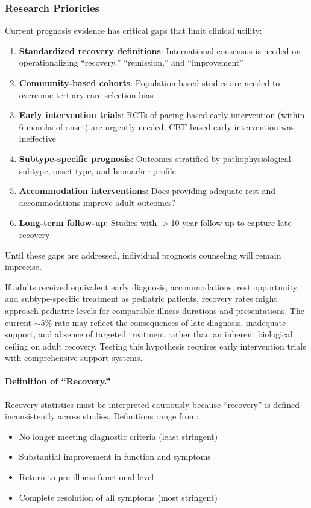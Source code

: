 \subsubsection{Research Priorities}

\begin{open_question}
Current prognosis evidence has critical gaps that limit clinical utility:
\begin{enumerate}
    \item \textbf{Standardized recovery definitions}: International consensus is needed on operationalizing ``recovery,'' ``remission,'' and ``improvement''
    \item \textbf{Community-based cohorts}: Population-based studies are needed to overcome tertiary care selection bias
    \item \textbf{Early intervention trials}: RCTs of pacing-based early intervention (within 6 months of onset) are urgently needed; CBT-based early intervention was ineffective
    \item \textbf{Subtype-specific prognosis}: Outcomes stratified by pathophysiological subtype, onset type, and biomarker profile
    \item \textbf{Accommodation interventions}: Does providing adequate rest and accommodations improve adult outcomes?
    \item \textbf{Long-term follow-up}: Studies with $>$10 year follow-up to capture late recovery
\end{enumerate}
Until these gaps are addressed, individual prognosis counseling will remain imprecise.
\end{open_question}

\begin{hypothesis}
\label{hyp:true-adult-recovery}
If adults received equivalent early diagnosis, accommodations, rest opportunity, and subtype-specific treatment as pediatric patients, recovery rates might approach pediatric levels for comparable illness durations and presentations. The current $\sim$5\% rate may reflect the consequences of late diagnosis, inadequate support, and absence of targeted treatment rather than an inherent biological ceiling on adult recovery. Testing this hypothesis requires early intervention trials with comprehensive support systems.
\end{hypothesis}

\paragraph{Definition of ``Recovery.''}
Recovery statistics must be interpreted cautiously because ``recovery'' is defined inconsistently across studies. Definitions range from:
\begin{itemize}
    \item No longer meeting diagnostic criteria (least stringent)
    \item Substantial improvement in function and symptoms
    \item Return to pre-illness functional level
    \item Complete resolution of all symptoms (most stringent)
\end{itemize}

